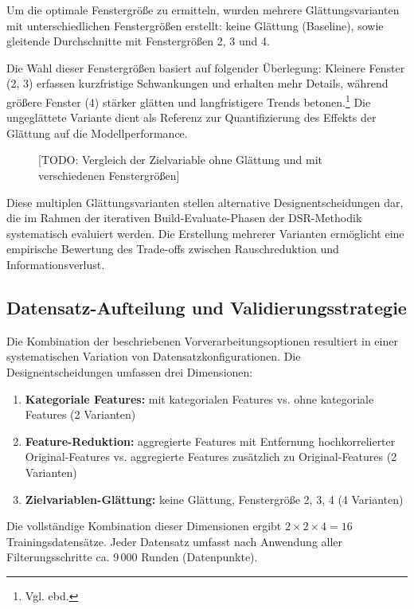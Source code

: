 Um die optimale Fenstergröße zu ermitteln, wurden mehrere Glättungsvarianten mit unterschiedlichen Fenstergrößen erstellt: keine Glättung (Baseline), sowie gleitende Durchschnitte mit Fenstergrößen 2, 3 und 4.

Die Wahl dieser Fenstergrößen basiert auf folgender Überlegung: Kleinere Fenster (2, 3) erfassen kurzfristige Schwankungen und erhalten mehr Details, während größere Fenster (4) stärker glätten und langfristigere Trends betonen.\footnote{Vgl. ebd.} Die ungeglättete Variante dient als Referenz zur Quantifizierung des Effekts der Glättung auf die Modellperformance.

\begin{figure}[H]
  \centering
  \caption{[TODO: Vergleich der Zielvariable ohne Glättung und mit verschiedenen Fenstergrößen]}
  \label{fig:smoothing_comparison}
\end{figure}

Diese multiplen Glättungsvarianten stellen alternative Designentscheidungen dar, die im Rahmen der iterativen Build-Evaluate-Phasen der DSR-Methodik systematisch evaluiert werden. Die Erstellung mehrerer Varianten ermöglicht eine empirische Bewertung des Trade-offs zwischen Rauschreduktion und Informationsverlust.


\subsection{Datensatz-Aufteilung und Validierungsstrategie}

Die Kombination der beschriebenen Vorverarbeitungsoptionen resultiert in einer systematischen Variation von Datensatzkonfigurationen. Die Designentscheidungen umfassen drei Dimensionen:

\begin{enumerate}
  \item \textbf{Kategoriale Features:} mit kategorialen Features vs. ohne kategoriale Features (2 Varianten)
  \item \textbf{Feature-Reduktion:} aggregierte Features mit Entfernung hochkorrelierter Original-Features vs. aggregierte Features zusätzlich zu Original-Features (2 Varianten)
  \item \textbf{Zielvariablen-Glättung:} keine Glättung, Fenstergröße 2, 3, 4 (4 Varianten)
\end{enumerate}
Die vollständige Kombination dieser Dimensionen ergibt $2 \times 2 \times 4 = 16$ Trainingsdatensätze. Jeder Datensatz umfasst nach Anwendung aller Filterungsschritte ca. 9\,000 Runden (Datenpunkte).

